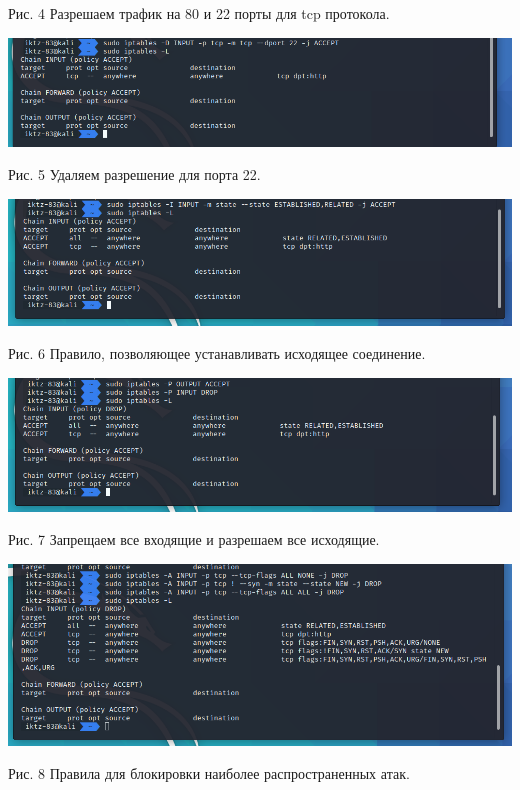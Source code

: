 \documentclass[a4paper,14pt]{extarticle}
\begin{document}
\begin{center}
        Рис. 4 Разрешаем трафик на 80 и 22 порты для tcp протокола.
        \vspace{1ex}

        \includegraphics[scale=0.5]{pics/5.png}

        Рис. 5 Удаляем разрешение для порта 22.
        \vspace{1ex}

        \includegraphics[scale=0.5]{pics/6.png}

        Рис. 6 Правило, позволяющее устанавливать исходящее соединение.  
        \vspace{1ex}

        \includegraphics[scale=0.5]{pics/7.png}
        
        Рис. 7 Запрещаем все входящие и разрешаем все исходящие.
        \vspace{1ex}

        \includegraphics[scale=0.5]{pics/8.png}

        Рис. 8  Правила для блокировки наиболее распространенных атак.
        \vspace{1ex}
    \end{center}
\end{document}
